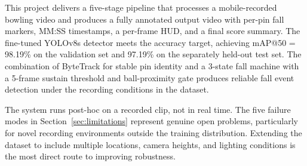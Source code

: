 \documentclass[11pt,a4paper]{article}
\begin{document}
This project delivers a five-stage pipeline that processes a mobile-recorded bowling video and produces a fully annotated output video with per-pin fall markers, MM:SS timestamps, a per-frame HUD, and a final score summary. The fine-tuned YOLOv8s detector meets the accuracy target, achieving mAP@50 = 98.19\% on the validation set and 97.19\% on the separately held-out test set. The combination of ByteTrack for stable pin identity and a 3-state fall machine with a 5-frame sustain threshold and ball-proximity gate produces reliable fall event detection under the recording conditions in the dataset.

The system runs post-hoc on a recorded clip, not in real time. The five failure modes in Section~\ref{sec:limitations} represent genuine open problems, particularly for novel recording environments outside the training distribution. Extending the dataset to include multiple locations, camera heights, and lighting conditions is the most direct route to improving robustness.
\end{document}
